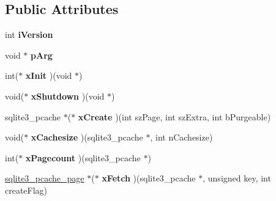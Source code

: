 \subsection*{Public Attributes}
\begin{DoxyCompactItemize}
\item 
int {\bfseries i\+Version}\hypertarget{structsqlite3__pcache__methods2_a03b27be6c7cb8f1d2662c454cbe58483}{}\label{structsqlite3__pcache__methods2_a03b27be6c7cb8f1d2662c454cbe58483}

\item 
void $\ast$ {\bfseries p\+Arg}\hypertarget{structsqlite3__pcache__methods2_a4bea91c33987eef02122bbf8a49745de}{}\label{structsqlite3__pcache__methods2_a4bea91c33987eef02122bbf8a49745de}

\item 
int($\ast$ {\bfseries x\+Init} )(void $\ast$)\hypertarget{structsqlite3__pcache__methods2_a8f77114458576c9d75cd53822fcd3462}{}\label{structsqlite3__pcache__methods2_a8f77114458576c9d75cd53822fcd3462}

\item 
void($\ast$ {\bfseries x\+Shutdown} )(void $\ast$)\hypertarget{structsqlite3__pcache__methods2_a00a780e295b89976940cd3cba2cfeaee}{}\label{structsqlite3__pcache__methods2_a00a780e295b89976940cd3cba2cfeaee}

\item 
sqlite3\+\_\+pcache $\ast$($\ast$ {\bfseries x\+Create} )(int sz\+Page, int sz\+Extra, int b\+Purgeable)\hypertarget{structsqlite3__pcache__methods2_a91e7752b826e19e7c51c1fa0ce530f0f}{}\label{structsqlite3__pcache__methods2_a91e7752b826e19e7c51c1fa0ce530f0f}

\item 
void($\ast$ {\bfseries x\+Cachesize} )(sqlite3\+\_\+pcache $\ast$, int n\+Cachesize)\hypertarget{structsqlite3__pcache__methods2_a4889ab0903938f485aa0fa4fc6925d26}{}\label{structsqlite3__pcache__methods2_a4889ab0903938f485aa0fa4fc6925d26}

\item 
int($\ast$ {\bfseries x\+Pagecount} )(sqlite3\+\_\+pcache $\ast$)\hypertarget{structsqlite3__pcache__methods2_a5d51aba3927db1da9acf31fbdf7d57b5}{}\label{structsqlite3__pcache__methods2_a5d51aba3927db1da9acf31fbdf7d57b5}

\item 
\hyperlink{structsqlite3__pcache__page}{sqlite3\+\_\+pcache\+\_\+page} $\ast$($\ast$ {\bfseries x\+Fetch} )(sqlite3\+\_\+pcache $\ast$, unsigned key, int create\+Flag)\hypertarget{structsqlite3__pcache__methods2_ac74dd2b35193a4309494311995da2d25}{}\label{structsqlite3__pcache__methods2_ac74dd2b35193a4309494311995da2d25}


\end{DoxyCompactItemize}
